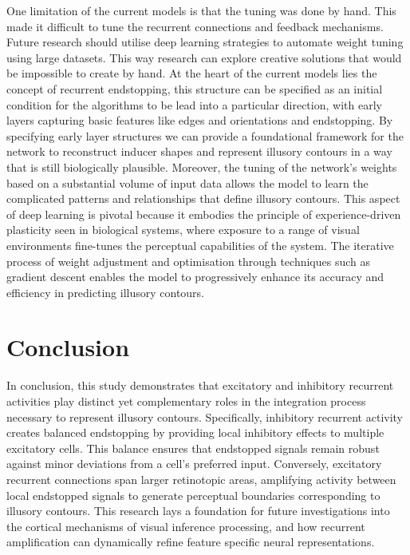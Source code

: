 \documentclass[12pt]{article}
\begin{document}
One limitation of the current models is that the tuning was done by hand. This made it difficult to tune the recurrent connections and feedback mechanisms. Future research should utilise deep learning strategies to automate weight tuning using large datasets. This way research can explore creative solutions that would be impossible to create by hand. At the heart of the current models lies the concept of recurrent endstopping, this structure can be specified as an initial condition for the algorithms to be lead into a particular direction, with early layers capturing basic features like edges and orientations and endstopping. By specifying early layer structures we can provide a foundational framework for the network to reconstruct inducer shapes and represent illusory contours in a way that is still biologically plausible. Moreover, the tuning of the network's weights based on a substantial volume of input data allows the model to learn the complicated patterns and relationships that define illusory contours. This aspect of deep learning is pivotal because it embodies the principle of experience-driven plasticity seen in biological systems, where exposure to a range of visual environments fine-tunes the perceptual capabilities of the system. The iterative process of weight adjustment and optimisation through techniques such as gradient descent enables the model to progressively enhance its accuracy and efficiency in predicting illusory contours.

\section*{Conclusion}
In conclusion, this study demonstrates that excitatory and inhibitory recurrent activities play distinct yet complementary roles in the integration process necessary to represent illusory contours. Specifically, inhibitory recurrent activity creates balanced endstopping by providing local inhibitory effects to multiple excitatory cells. This balance ensures that endstopped signals remain robust against minor deviations from a cell's preferred input. Conversely, excitatory recurrent connections span larger retinotopic areas, amplifying activity between local endstopped signals to generate perceptual boundaries corresponding to illusory contours. This research lays a foundation for future investigations into the cortical mechanisms of visual inference processing, and how recurrent amplification can dynamically refine feature specific neural representations. 
\end{document}
